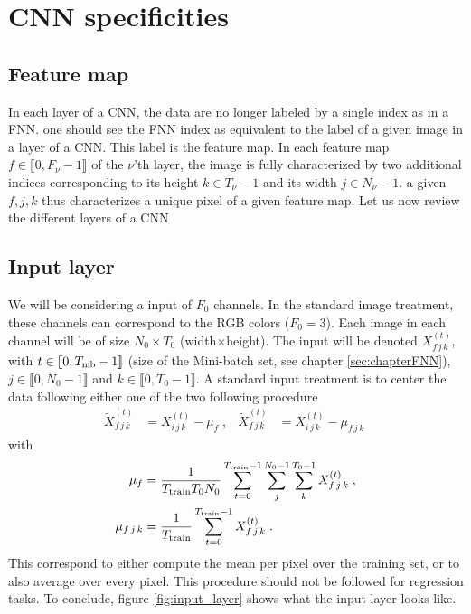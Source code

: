 \section{CNN specificities}



\subsection{Feature map}

In each layer of a CNN, the data are no longer labeled by a single index as in a FNN. one should see the FNN index as equivalent to the label of a given image in a layer of a CNN. This label is the feature map. In each feature map $f\in \llbracket 0,F_\nu-1\rrbracket$ of the $\nu$'th layer, the image is fully characterized by two additional indices corresponding to its height $k\in T_\nu-1$ and its width $j\in N_\nu-1$. a given $f,j,k$ thus characterizes a unique pixel of a given feature map. Let us now review the different layers of a CNN

\subsection{Input layer}


We will be considering a input of $F_0$ channels. In the standard image treatment, these channels can correspond to the RGB colors ($F_0=3$). Each image in each channel will be of size $N_0\times T_0$ (width$\times$height). The input will be denoted $X^{(t)}_{f\,j\,k}$, with $t\in \llbracket 0, T_{{\rm mb}}-1\rrbracket$ (size of the Mini-batch set, see chapter \ref{sec:chapterFNN}), $j \in \llbracket 0, N_0-1\rrbracket$ and $k \in \llbracket 0, T_0-1\rrbracket$. A standard input treatment is to center the data following either one of the two following procedure
\begin{align}
\tilde{X}^{(t)}_{f\,j\,k}&=X^{(t)}_{i\,j\,k}-\mu_{f}\;,&
%
\tilde{X}^{(t)}_{f\,j\,k}&=X^{(t)}_{i\,j\,k}-\mu_{f\,j\,k}\;
\end{align}
with
\begin{align}
\mu_{f}&=\frac{1}{T_{{\rm train}}T_0 N_0}\sum^{T_{{\rm train}}-1}_{t=0}\sum_j^{N_0-1}
%
\sum_k^{T_0-1}X^{(t)}_{f\,j\,k}\;,\\
%
\mu_{f\,j\,k}&=\frac{1}{T_{{\rm train}}}\sum^{T_{{\rm train}}-1}_{t=0}X^{(t)}_{f\,j\,k}\;.
\end{align}
This correspond to either compute the mean per pixel over the training set, or to also average over every pixel. This procedure should not be followed for regression tasks. To conclude, figure \ref{fig:input_layer} shows what the input layer looks like.

